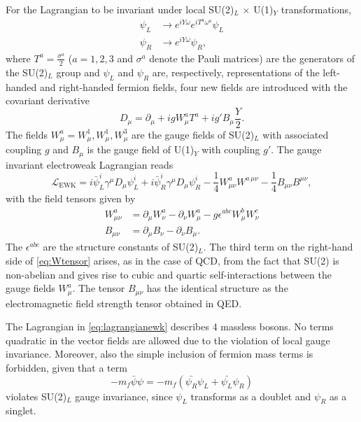 For the Lagrangian to be invariant under local SU(2)$_L$ $\times$ U(1)$_Y$ transformations, 
\begin{align}
  \psi_L &\rightarrow e^{iY\omega} e^{iT^a\omega^a} \psi_L  \\
  \psi_R &\rightarrow e^{iY\omega} \psi_R,
\end{align} 
where $T^a = \frac{\sigma^a}{2}$ ($a = 1, 2, 3$ and $\sigma^a$ denote the Pauli matrices) are the generators of the SU(2)$_L$ group and $\psi_L$ and $\psi_R$ are, respectively, representations of the left-handed and right-handed fermion fields, four new fields are introduced with the covariant derivative
\begin{equation}
  D_\mu = \partial_\mu + igW_\mu^aT^a + ig'B_\mu \frac{Y}{2}.
  \label{eq:covdevewk}
\end{equation}
The fields $W^a_\mu = W^1_\mu, W^1_\mu, W^3_\mu$ are the gauge fields of SU(2)$_L$ with associated coupling $g$ and $B_\mu$ is the gauge field of U(1)$_Y$ with coupling $g'$.
The gauge invariant electroweak Lagrangian reads
\begin{equation}
  \mathcal{L}_{\text{EWK}} = i\bar{\psi}^i_L\gamma^\mu D_\mu \psi^i_L + i\bar{\psi}^i_R\gamma^\mu D_\mu \psi^i_R - \frac{1}{4}W_{\mu\nu}^aW^{a\,\mu\nu} - \frac{1}{4} B_{\mu\nu}B^{\mu\nu},
  \label{eq:lagrangianewk}
\end{equation}
with the field tensors given by
\begin{align}
  W_{\mu\nu}^a &= \partial_\mu W_\nu^a - \partial_\nu W_\mu^a - g \epsilon^{abc} W^b_\mu W^c_\nu \label{eq:Wtensor} \\
  B_{\mu\nu} &= \partial_\mu B_\nu - \partial_\nu B_\mu.
\end{align}
The $\epsilon^{abc}$ are the structure constants of SU(2)$_L$. The third term on the right-hand side of \cref{eq:Wtensor} arises, as in the case of QCD, from the fact that SU(2) is non-abelian and gives rise to cubic and quartic self-interactions between the gauge fields $W_{\mu}^a$. The tensor $B_{\mu\nu}$ has the identical structure as the electromagnetic field strength tensor obtained in QED.

The Lagrangian in \cref{eq:lagrangianewk} describes 4 massless bosons. No terms quadratic in the vector fields are allowed due to the violation of local gauge invariance. Moreover, also the simple inclusion of fermion mass terms is forbidden, given that a term
\begin{equation}
  -m_f \bar{\psi} \psi = -m_f \left( \bar{\psi_R}\psi_L + \bar{\psi_L}\psi_R \right)
  \label{eq:fermionmassterm}
\end{equation}
violates SU(2)$_L$ gauge invariance, since $\psi_L$ transforms as a doublet and $\psi_R$ as a singlet.

